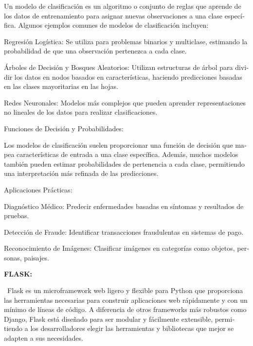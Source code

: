 \documentclass[letterpaper]{article}
\begin{document}
{
\foreignlanguage{spanish}{Un modelo de clasificación es un algoritmo o conjunto de reglas que aprende de los datos de
entrenamiento para asignar nuevas observaciones a una clase específica. Algunos ejemplos comunes de modelos de
clasificación incluyen:}}

{
\foreignlanguage{spanish}{Regresión Logística: Se utiliza para problemas binarios y multiclase, estimando la
probabilidad de que una observación pertenezca a cada clase.}}

{
\foreignlanguage{spanish}{Árboles de Decisión y Bosques Aleatorios: Utilizan estructuras de árbol para dividir los datos
en nodos basados en características, haciendo predicciones basadas en las clases mayoritarias en las hojas.}}

{
\foreignlanguage{spanish}{Redes Neuronales: Modelos más complejos que pueden aprender representaciones no lineales de
los datos para realizar clasificaciones.}}

{
\foreignlanguage{spanish}{Funciones de Decisión y Probabilidades:}}

{
\foreignlanguage{spanish}{Los modelos de clasificación suelen proporcionar una función de decisión que mapea
características de entrada a una clase específica. Además, muchos modelos también pueden estimar probabilidades de
pertenencia a cada clase, permitiendo una interpretación más refinada de las predicciones.}}

{
\foreignlanguage{spanish}{Aplicaciones Prácticas:}}

{
\foreignlanguage{spanish}{Diagnóstico Médico: Predecir enfermedades basadas en síntomas y resultados de pruebas.}}

{
\foreignlanguage{spanish}{Detección de Fraude: Identificar transacciones fraudulentas en sistemas de pago.}}

{
\foreignlanguage{spanish}{Reconocimiento de Imágenes: Clasificar imágenes en categorías como objetos, personas,
paisajes.}}


\bigskip
\bigskip
\bigskip
\bigskip
\bigskip
\bigskip
\bigskip
\bigskip
\bigskip
\bigskip
\bigskip
\bigskip

{
\bigskip
\bigskip
\bigskip
\bigskip
\foreignlanguage{spanish}{\textbf{FLASK:}}}

{
\foreignlanguage{spanish}{\ Flask es un microframework web ligero y flexible para Python que proporciona las
herramientas necesarias para construir aplicaciones web rápidamente y con un mínimo de líneas de código. A diferencia
de otros frameworks más robustos como Django, Flask está diseñado para ser modular y fácilmente extensible, permitiendo
a los desarrolladores elegir las herramientas y bibliotecas que mejor se adapten a sus necesidades.}}
\end{document}

